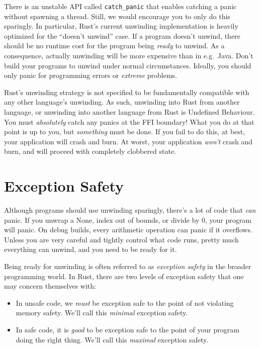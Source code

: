 \documentclass[a4paper,]{book}
\begin{document}
There is an unstable API called \texttt{catch\_panic} that enables
catching a panic without spawning a thread. Still, we would encourage
you to only do this sparingly. In particular, Rust's current unwinding
implementation is heavily optimized for the ``doesn't unwind'' case. If
a program doesn't unwind, there should be no runtime cost for the
program being \emph{ready} to unwind. As a consequence, actually
unwinding will be more expensive than in e.g.~Java. Don't build your
programs to unwind under normal circumstances. Ideally, you should only
panic for programming errors or \emph{extreme} problems.

Rust's unwinding strategy is not specified to be fundamentally
compatible with any other language's unwinding. As such, unwinding into
Rust from another language, or unwinding into another language from Rust
is Undefined Behaviour. You must \emph{absolutely} catch any panics at
the FFI boundary! What you do at that point is up to you, but
\emph{something} must be done. If you fail to do this, at best, your
application will crash and burn. At worst, your application \emph{won't}
crash and burn, and will proceed with completely clobbered state.

\section{Exception Safety}\label{sec--exception-safety}

Although programs should use unwinding sparingly, there's a lot of code
that \emph{can} panic. If you unwrap a None, index out of bounds, or
divide by 0, your program will panic. On debug builds, every arithmetic
operation can panic if it overflows. Unless you are very careful and
tightly control what code runs, pretty much everything can unwind, and
you need to be ready for it.

Being ready for unwinding is often referred to as \emph{exception
safety} in the broader programming world. In Rust, there are two levels
of exception safety that one may concern themselves with:

\begin{itemize}
\item
  In unsafe code, we \emph{must} be exception safe to the point of not
  violating memory safety. We'll call this \emph{minimal} exception
  safety.
\item
  In safe code, it is \emph{good} to be exception safe to the point of
  your program doing the right thing. We'll call this \emph{maximal}
  exception safety.
\end{itemize}
\end{document}
